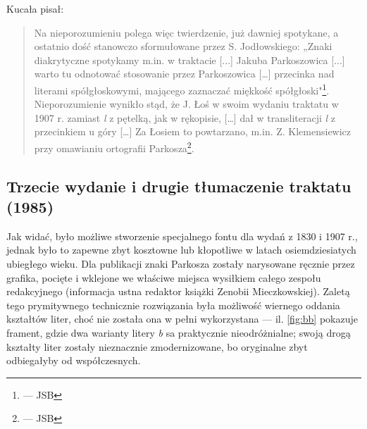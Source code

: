   Kucała \autocite*[s. 20]{TraktatPWN1985} pisał:
\begin{quote}
  Na nieporozumieniu
  polega więc twierdzenie, już dawniej spotykane, a ostatnio dość
  stanowczo sformułowane przez S. Jodłowskiego: „Znaki diakrytyczne
  spotykamy m.in. w traktacie [...]  Jakuba Parkoszowica [...] warto
  tu odnotować stosowanie przez Parkoszowica
  [\ldots] przecinka nad literami spółgłoskowymi, mającego zaznaczać
  miękkość spółgłoski"\footnote{\autocite[s. 22-23]{jodłowski79:_losy} --- JSB}.  Nieporozumienie wynikło
  stąd, że J. Łoś w swoim wydaniu traktatu w 1907 r.  zamiast
  \textit{l} z pętelką, jak w rękopisie,
  [\ldots]
  dał w transliteracji \textit{l} z przecinkiem u góry [\ldots]
  Za Łosiem to powtarzano, m.in. Z. Klemensiewicz przy omawianiu
  ortografii
  Parkosza\footnote{\autocite[s. 102]{klemensiewicz61:_histor} ---
    JSB}.
\end{quote}

\subsection{Trzecie wydanie  i drugie tłumaczenie traktatu (1985)}
\label{sec:wydanie-kucay}
Jak widać, było możliwe stworzenie specjalnego fontu dla wydań z 1830
i 1907 r., jednak było to zapewne zbyt kosztowne lub kłopotliwe w
latach osiemdziesiatych ubiegłego wieku. Dla publikacji
\autocite{TraktatPWN1985} znaki Parkosza zostały narysowane ręcznie
przez grafika, pocięte i wklejone we właściwe miejsca wysiłkiem całego
zespołu redakcyjnego (informacja ustna redaktor książki Zenobii
Mieczkowskiej). Zaletą tego prymitywnego technicznie rozwiązania była
możliwość wiernego oddania kształtów liter, choć nie została ona w
pełni wykorzystana --- il. \vref{fig:bb} pokazuje frament, gdzie dwa
warianty litery \textit{b} sa praktycznie nieodróżnialne; swoją drogą
kształty liter zostały nieznacznie zmodernizowane, bo oryginalne zbyt
odbiegałyby od współczesnych.

